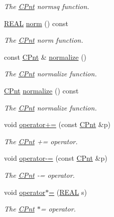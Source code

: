 \begin{DoxyCompactItemize}
\begin{DoxyCompactList}\small\item\em The \hyperlink{classCPnt}{C\-Pnt} normsq function. \end{DoxyCompactList}\item 
\hyperlink{util_8h_a5821460e95a0800cf9f24c38915cbbde}{R\-E\-A\-L} \hyperlink{classCPnt_ab92f2e6cc3891ff6a00eddb483b854ab}{norm} () const 
\begin{DoxyCompactList}\small\item\em The \hyperlink{classCPnt}{C\-Pnt} norm function. \end{DoxyCompactList}\item 
const \hyperlink{classCPnt}{C\-Pnt} \& \hyperlink{classCPnt_a79e4515e6479905942ce4b48990943f0}{normalize} ()
\begin{DoxyCompactList}\small\item\em The \hyperlink{classCPnt}{C\-Pnt} normalize function. \end{DoxyCompactList}\item 
\hyperlink{classCPnt}{C\-Pnt} \hyperlink{classCPnt_a59899074de56c4ad55583fc58d48ea0a}{normalize} () const 
\begin{DoxyCompactList}\small\item\em The \hyperlink{classCPnt}{C\-Pnt} normalize function. \end{DoxyCompactList}\item 
void \hyperlink{classCPnt_ab9aa57d527e60e0ba46fd44ee515ebb0}{operator+=} (const \hyperlink{classCPnt}{C\-Pnt} \&p)
\begin{DoxyCompactList}\small\item\em The \hyperlink{classCPnt}{C\-Pnt} += operator. \end{DoxyCompactList}\item 
void \hyperlink{classCPnt_aad46f39ec4811f1f7c39b33b0ef55f42}{operator-\/=} (const \hyperlink{classCPnt}{C\-Pnt} \&p)
\begin{DoxyCompactList}\small\item\em The \hyperlink{classCPnt}{C\-Pnt} -\/= operator. \end{DoxyCompactList}\item 
void \hyperlink{classCPnt_a30b6c20eb5777d321202db9006fe5dc0}{operator$\ast$=} (\hyperlink{util_8h_a5821460e95a0800cf9f24c38915cbbde}{R\-E\-A\-L} s)
\begin{DoxyCompactList}\small\item\em The \hyperlink{classCPnt}{C\-Pnt} $\ast$= operator. \end{DoxyCompactList}\item 

\end{DoxyCompactItemize}
